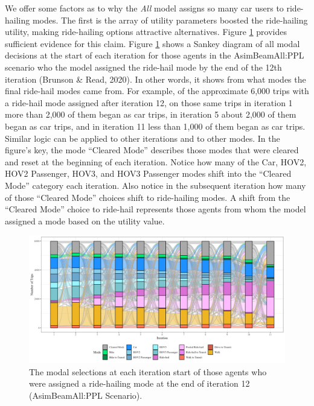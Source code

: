 \documentclass[simple, masters, twoside]{byuthesis}
\begin{document}
We offer some factors as to why the \emph{All} model assigns so many car users to ride-hailing modes. The first is the array of utility parameters boosted the ride-hailing utility, making ride-hailing options attractive alternatives. Figure \ref{fig:sankey} provides sufficient evidence for this claim. Figure \ref{fig:sankey} shows a Sankey diagram of all modal decisions at the start of each iteration for those agents in the AsimBeamAll:PPL scenario who the model assigned the ride-hail mode by the end of the 12th iteration (Brunson \& Read, 2020). In other words, it shows from what modes the final ride-hail modes came from. For example, of the approximate 6,000 trips with a ride-hail mode assigned after iteration 12, on those same trips in iteration 1 more than 2,000 of them began as car trips, in iteration 5 about 2,000 of them began as car trips, and in iteration 11 less than 1,000 of them began as car trips. Similar logic can be applied to other iterations and to other modes. In the figure's key, the mode ``Cleared Mode'' describes those modes that were cleared and reset at the beginning of each iteration. Notice how many of the Car, HOV2, HOV2 Passenger, HOV3, and HOV3 Passenger modes shift into the ``Cleared Mode'' category each iteration. Also notice in the subsequent iteration how many of those ``Cleared Mode'' choices shift to ride-hailing modes. A shift from the ``Cleared Mode'' choice to ride-hail represents those agents from whom the model assigned a mode based on the utility value.

\begin{figure}

\centering
\includegraphics[width = 1.05\paperwidth]{planshifts.png}
\caption[Selection process of agents who the model assigned to ride-hail.]{The modal selections at each iteration start of those agents who were assigned a ride-hailing mode at the end of iteration 12 (AsimBeamAll:PPL Scenario).}
\label{fig:sankey}

\end{figure}
\end{document}
